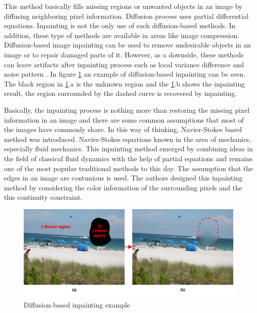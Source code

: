 This method basically fills missing regions or unwanted objects in an image by diffusing neighboring pixel information. Diffusion process uses partial differential equations. Inpainting is not the only use of such diffusion-based methods. In addition, these type of methods are available in areas like image compression. Diffusion-based image inpainting can be used to remove undesirable objects in an image or to repair damaged parts of it. However, as a downside, these methods can leave artifacts after inpainting process such as local variance difference and noise pattern \cite{diffusion_based_artifacts}. In figure \ref{fig:diffusion_based_inpainting} an example of diffusion-based inpainting can be seen. The black region in \ref{fig:diffusion_based_inpainting}.a is the unknown region and the \ref{fig:diffusion_based_inpainting}.b shows the inpainting result, the region surrounded by the dashed curve is recovered by inpainting.

Basically, the inpainting process is nothing more than restoring the missing pixel information in an image and there are some common assumptions that most of the images have commonly share. In this way of thinking, Navier-Stokes based method \cite{navier_stokes} was introduced. Navier-Stokes equations known in the area of mechanics, especially fluid mechanics. This inpainting method emerged by combining ideas in the field of classical fluid dynamics with the help of partial equations and remains one of the most popular traditional methods to this day. The assumption that the edges in an image are contunious is used. The authors designed this inpainting method by considering the color information of the surrounding pixels and the this continuity constraint.

\begin{figure}[h]
    \centering
    \includegraphics[width=14cm]{figures/diffusion_based_inpainting.png}
    \caption{Diffusion-based inpainting example \cite{diffusion_based_inpainting}}
    \label{fig:diffusion_based_inpainting}
\end{figure}

